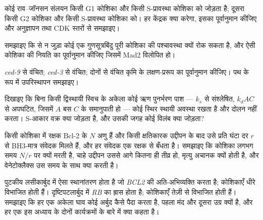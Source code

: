 \begin{exercise}[$\star\star$]\label{exo:b3:cell-cycle-apoptosis:7}
कोई राव--जॉनसन संलयन किसी G1 कोशिका और किसी S-प्रावस्था कोशिका को
जोड़ता है; दूसरा किसी G2 कोशिका और किसी S-प्रावस्था कोशिका को। हर
केंद्रक क्या करेगा, इसका पूर्वानुमान कीजिए और अनुज्ञापन तथा CDK स्तरों
से समझाइए।
\end{exercise}

\begin{exercise}[$\star\star$]\label{exo:b3:cell-cycle-apoptosis:8}
समझाइए कि  से न जुड़ा कोई एक गुणसूत्रबिंदु पूरी कोशिका की
पश्चावस्था क्यों रोक सकता है, और ऐसी कोशिका की नियति का पूर्वानुमान
कीजिए जिसमें Mad2 विलोपित हो।
\end{exercise}

\begin{exercise}[$\star\star$]\label{exo:b3:cell-cycle-apoptosis:9}
\emph{ced-9} से वंचित; \emph{ced-3} से वंचित; दोनों से वंचित कृमि के
लक्षण-प्ररूप का पूर्वानुमान कीजिए। पथ के रूप में उपरिस्थापन समझाइए।
\end{exercise}

\begin{exercise}[$\star\star\star$]\label{exo:b3:cell-cycle-apoptosis:10}
दिखाइए कि बिना किसी द्विस्थायी स्विच के अकेला कोई ऋण पुनर्भरण पाश ---
 $k_{s}$ से संश्लेषित, $k_{d}AC$ से अपघटित, जिसमें $A$
बस $C$ के समानुपाती हो --- कोई स्थिर स्थायी अवस्था रखता है और दोलन
नहीं करता। S-आकार वक्र क्या जोड़ता है, और उसकी जगह कोई विलंब क्या
जोड़ता?
\end{exercise}

\begin{exercise}[$\star\star\star$]\label{exo:b3:cell-cycle-apoptosis:11}
किसी कोशिका में रक्षक Bcl-2 के $N$ अणु हैं और किसी क्षतिकारक उद्दीपन के
बाद उसे प्रति घंटा दर $r$ से BH3-मात्र संवेदक मिलते हैं, और हर संवेदक
एक रक्षक से बँधता है। समझाइए कि कोशिका लगभग समय $N/r$ पर क्यों मरती है,
चाहे उद्दीपन उससे आगे कितना ही तीव्र हो, मृत्यु अचानक क्यों होती है,
और वेनेटोक्लैक्स उस समय के साथ क्या करती है।
\end{exercise}

\begin{exercise}[$\star\star\star$]\label{exo:b3:cell-cycle-apoptosis:12}
पुटकीय लसीकार्बुद में ऐसा स्थानांतरण होता है जो \emph{BCL2} की
अति-अभिव्यक्ति करता है; कोशिकाएँ धीरे विभाजित होती हैं। दृष्टिपटलार्बुद
में \emph{RB} का ह्रास होता है; कोशिकाएँ तेज़ी से विभाजित होती हैं।
समझाइए कि हर एक अकेला घाव कोई अर्बुद कैसे पैदा करता है, पहला मंद और
दूसरा उग्र क्यों है, और हर एक इस अध्याय के दोनों कार्यक्रमों के बारे
में क्या कहता है।
\end{exercise}

